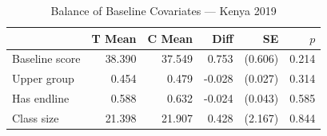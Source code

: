 \begin{table}[htbp]
\centering
\small
\caption{Balance of Baseline Covariates --- Kenya 2019}
\label{tab:ke2_balance}
\begin{tabular}{l*{5}{r}}
\toprule
 & T Mean & C Mean & Diff & SE & $p$ \\
\midrule
Baseline score & 38.390 & 37.549 & 0.753 & (0.606) & 0.214 \\
Upper group & 0.454 & 0.479 & -0.028 & (0.027) & 0.314 \\
Has endline & 0.588 & 0.632 & -0.024 & (0.043) & 0.585 \\
Class size & 21.398 & 21.907 & 0.428 & (2.167) & 0.844 \\
\bottomrule
\end{tabular}
\par\smallskip{}
\end{table}